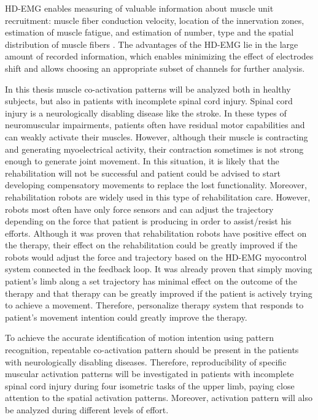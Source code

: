    HD-EMG enables measuring of valuable information about muscle unit recruitment: muscle fiber conduction velocity, location of the innervation zones, estimation of muscle fatigue, and estimation of number, type and the spatial distribution of muscle fibers \citep{Marateb2016}. The advantages of the HD-EMG lie in the large amount of recorded information, which enables minimizing the effect of electrodes shift and allows choosing an appropriate subset of channels for further analysis.
    
In this thesis muscle co-activation patterns will be analyzed both in healthy subjects, but also in patients with incomplete spinal cord injury. Spinal cord injury is a neurologically disabling disease like the stroke. In these types of neuromuscular impairments, patients often have residual motor capabilities and can weakly activate their muscles. However, although their muscle is contracting and generating myoelectrical activity, their contraction sometimes is not strong enough to generate joint movement. In this situation, it is likely that the rehabilitation will not be successful and patient could be advised to start developing compensatory movements to replace the lost functionality. Moreover, rehabilitation robots are widely used in this type of rehabilitation care. However, robots most often have only force sensors and can adjust the trajectory depending on the force that patient is producing in order to assist/resist his efforts. Although it was proven that rehabilitation robots have positive effect on the therapy, their effect on the rehabilitation could be greatly improved if the robots would adjust the force and trajectory based on the HD-EMG myocontrol system connected in the feedback loop. It was already proven that simply moving patient's limb along a set trajectory has minimal effect on the outcome of the therapy and that therapy can be greatly improved if the patient is actively trying to achieve a movement. Therefore, personalize therapy system that responds to patient's movement intention could greatly improve the therapy.

To achieve the accurate identification of motion intention using pattern recognition, repeatable co-activation pattern should be present in the patients with neurologically disabling diseases. Therefore, reproducibility of specific muscular activation patterns will be investigated in patients with incomplete spinal cord injury during four isometric tasks of the upper limb, paying close attention to the spatial activation patterns. Moreover, activation pattern will also be analyzed during different levels of effort.

